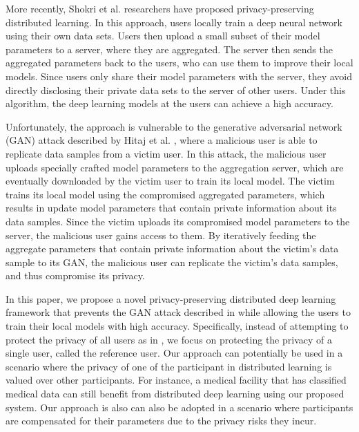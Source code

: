 \documentclass[conference]{IEEEtran}
\begin{document}
More recently,  Shokri et al.  \cite{shokri2015privacy} researchers have proposed privacy-preserving distributed learning. In this
approach, users locally train a deep neural network using their own data sets. Users then upload a small subset of their model
parameters to a server, where they  are aggregated. The server then sends the aggregated parameters back to the users, who can use
them to improve their local models. Since users only share their model parameters with the server, they avoid directly disclosing their
private data sets to the server of other users. Under this algorithm, the deep learning models at the users can achieve a high
accuracy. 

Unfortunately,  the approach \cite{shokri2015privacy} is vulnerable to the generative adversarial network (GAN) attack described by 
Hitaj  et al. \cite{hitaj2017deep}, where  a malicious user is able to replicate data samples from a victim user. In this attack, 
the malicious user uploads specially crafted model parameters to the aggregation server, which are eventually downloaded by the victim
user to train its local model. The victim trains its local model using the compromised aggregated parameters, which results in
update model parameters that contain private information about its data samples. Since the victim uploads its compromised model
parameters to the server, the malicious user gains access to them. By iteratively feeding the aggregate parameters that contain private
information about the victim's data sample to its GAN, the malicious user can replicate the victim's data samples, and thus compromise its
privacy.

In this paper, we propose a novel privacy-preserving distributed deep learning framework that prevents the GAN attack described in 
\cite{hitaj2017deep} while allowing the users to train their local models with high accuracy. 
Specifically, instead of attempting to protect the privacy of all users as in \cite{shokri2015privacy}, we focus on protecting the
privacy of a single user, called the reference user. 
Our approach can potentially be used in a scenario where the privacy of one of the participant in distributed learning is valued over other participants. For instance, a medical facility that has classified medical data can still benefit from distributed deep learning using our proposed system.
Our approach is also can also be adopted in a scenario where participants are compensated for their parameters due to the privacy risks they incur.
\end{document}
